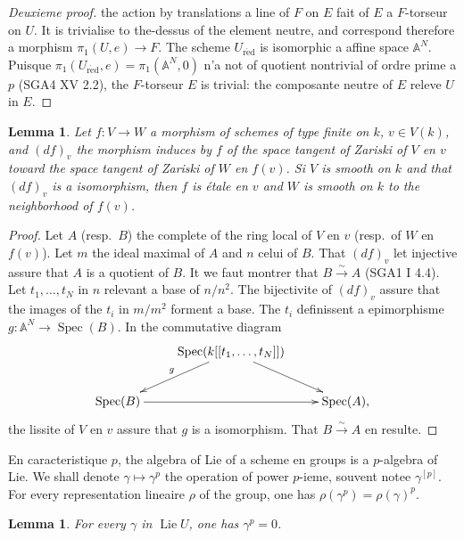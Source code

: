 \documentclass[11pt,a4paper]{article}
\theoremstyle{plain}
\newtheorem{lemma}[theorem]{Lemma}
\theoremstyle{definition}
\DeclareMathOperator{\Spec}{Spec}
\DeclareMathOperator{\Lie}{Lie}
\newcommand{\red}{\mathrm{r\acute{e}d}}
\begin{document}
\begin{proof}[Deuxieme proof]
the action by translations a line of $F$ on $E$ fait of $E$ a $F$-torseur on $U$. It is trivialise to the-dessus of the element neutre, and correspond therefore a morphism $\pi_1(U,e) \to F$. The scheme $U_\red$ is isomorphic a affine space $\mathbb{A}^N$. Puisque $\pi_1(U_\red,e) = \pi_1(\mathbb{A}^N,0)$ n'a not of quotient nontrivial of ordre prime a $p$ (SGA4 XV 2.2), the $F$-torseur $E$ is trivial: the composante neutre of $E$ releve $U$ in $E$.
\end{proof}

\begin{lemma}\label{lem:1.9}
Let $f: V \to W$ a morphism of schemes of type finite on $k$, $v \in V(k)$, and $(df)_v$ the morphism induces by $f$ of the space tangent of Zariski of $V$ en $v$ toward the space tangent of Zariski of $W$ en $f(v)$. Si $V$ is smooth on $k$ and that $(df)_v$ is a isomorphism, then $f$ is étale en $v$ and $W$ is smooth on $k$ to the neighborhood of $f(v)$.
\end{lemma}

\begin{proof}
Let $A$ (resp.\ $B$) the complete of the ring local of $V$ en $v$ (resp.\ of $W$ en $f(v)$). Let $m$ the ideal maximal of $A$ and $n$ celui of $B$. That $(df)_v$ let injective assure that $A$ is a quotient of $B$. It we faut montrer that $B \xrightarrow{\sim} A$ (SGA1 I 4.4). Let $t_1,\ldots,t_N$ in $n$ relevant a base of $n/n^2$. The bijectivite of $(df)_v$ assure that the images of the $t_i$ in $m/m^2$ forment a base. The $t_i$ definissent a epimorphisme $g: \mathbb{A}^N \to \Spec(B)$. In the commutative diagram
\[
\xymatrix{
& \Spec(k[[t_1,\ldots,t_N]]) \ar[dl]_{g} \ar[dr] & \\
\Spec(B) \ar[rr] & & \Spec(A),
}
\]
the lissite of $V$ en $v$ assure that $g$ is a isomorphism. That $B \xrightarrow{\sim} A$ en resulte.
\end{proof}

En caracteristique $p$, the algebra of Lie of a scheme en groups is a $p$-algebra of Lie. We shall denote $\gamma \mapsto \gamma^p$ the operation of power $p$-ieme, souvent notee $\gamma^{[p]}$. For every representation lineaire $\rho$ of the group, one has $\rho(\gamma^p) = \rho(\gamma)^p$.

\begin{lemma}\label{lem:1.10}
For every $\gamma$ in $\Lie U$, one has $\gamma^p = 0$.
\end{lemma}
\end{document}
